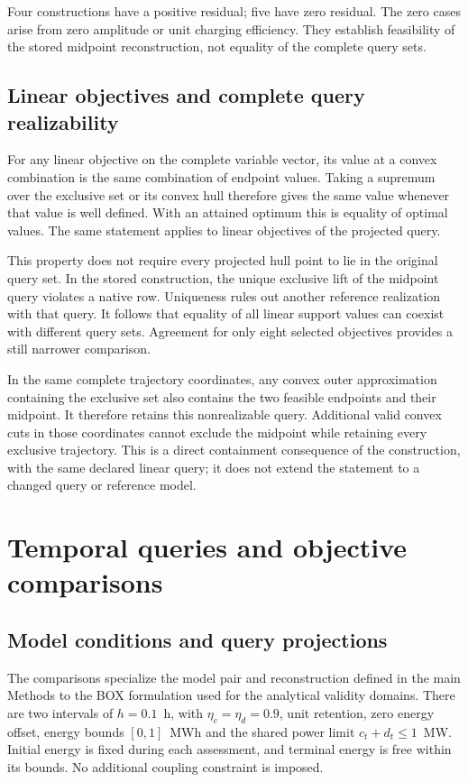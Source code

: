 Four constructions have a positive residual; five have zero residual.
The zero cases arise from zero amplitude or unit charging efficiency.
They establish feasibility of the stored midpoint reconstruction,
not equality of the complete query sets.


\subsection{Linear objectives and complete query realizability}
For any linear objective on the complete variable vector, its value at a
convex combination is the same combination of endpoint values. Taking a
supremum over the exclusive set or its convex hull therefore gives the
same value whenever that value is well defined. With an attained optimum
this is equality of optimal values. The same statement applies to linear
objectives of the projected query.

This property does not require every projected hull point to lie in the
original query set. In the stored construction, the unique exclusive lift
of the midpoint query violates a native row. Uniqueness rules out another
reference realization with that query. It follows that equality of all
linear support values can coexist with different query sets. Agreement
for only eight selected objectives provides a still narrower comparison.

In the same complete trajectory coordinates, any convex outer approximation
containing the exclusive set also contains the two feasible endpoints and
their midpoint. It therefore retains this nonrealizable query. Additional
valid convex cuts in those coordinates cannot exclude the midpoint while
retaining every exclusive trajectory. This is a direct containment
consequence of the construction, with the same declared linear query;
it does not extend the statement to a changed query or reference model.


\section{Temporal queries and objective comparisons}
\label{si:temporal_queries}

\subsection{Model conditions and query projections}
\label{si:temporal_setup}
The comparisons specialize the model pair and reconstruction defined in the main Methods to the BOX formulation used for the analytical validity domains. There are two intervals of $h=0.1$~h, with $\eta_c=\eta_d=0.9$, unit retention, zero energy offset, energy bounds $[0,1]$~MWh and the shared power limit $c_t+d_t\leq1$~MW. Initial energy is fixed during each assessment, and terminal energy is free within its bounds. No additional coupling constraint is imposed.

